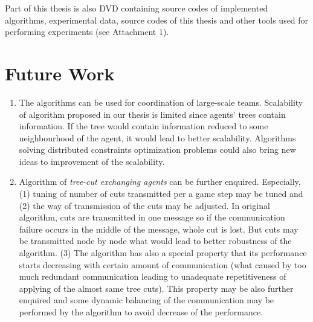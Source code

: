 Part of this thesis is also DVD containing source codes of implemented algorithms, experimental
data, source codes of this thesis and other tools used for performing experiments (see
Attachment 1).


\section*{Future Work}

\begin{enumerate}
\item The algorithms can be used for coordination of large-scale
teams. Scalability of algorithm proposed in our thesis is limited since
agents' trees contain information. If the tree would contain information reduced to some
neighbourhood of the agent, it would lead to better scalability. Algorithms solving distributed 
constraints optimization problems could also bring new ideas to improvement of the scalability.

\item Algorithm of \emph{tree-cut exchanging agents} can be further enquired. Especially, (1)
tuning of number of cuts transmitted per a game step may be tuned and (2) the way of
transmission of the cuts may be adjusted. In original algorithm, cuts are transmitted in one
message so if the communication failure occurs in the middle of the message, whole cut is lost.
But cuts may be transmitted node by node what would lead to better robustness of the algorithm.
(3) The algorithm has also a special property that its performance starts decreasing with
certain amount of communication (what caused by too much redundant communication leading to
unadequate repetitiveness of applying of the almost same tree cuts). This property may be
also further enquired and some dynamic balancing of the communication may be performed by the
algorithm to avoid decrease of the performance.

\end{enumerate}


